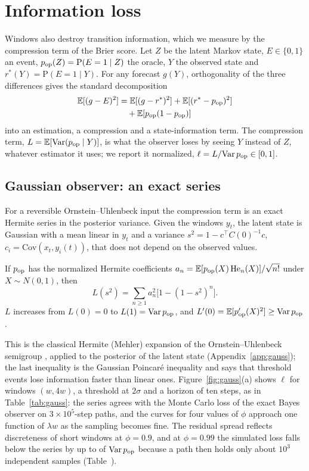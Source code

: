\section{Information loss}\label{sec:info}

Windows also destroy transition information, which we measure by the compression term of the Brier score. Let $Z$ be the latent Markov state, $E\in\{0,1\}$ an event, $p_{\mathrm{op}}(Z)=\mathrm P(E=1\mid Z)$ the oracle, $Y$ the observed state and $r^*(Y)=\mathrm P(E=1\mid Y)$. For any forecast $g(Y)$, orthogonality of the three differences gives the standard decomposition \cite{murphy1973,degroot1983,brocker2009}
\begin{align}
\mathbb{E}[(g-E)^2]&=\mathbb{E}[(g-r^*)^2]+\mathbb{E}[(r^*-p_{\mathrm{op}})^2]\nonumber\\
&\quad+\mathbb{E}[p_{\mathrm{op}}(1-p_{\mathrm{op}})]
\end{align}
into an estimation, a compression and a state-information term. The compression term, $L=\mathbb{E}[\mathrm{Var}(p_{\mathrm{op}}\mid Y)]$, is what the observer loses by seeing $Y$ instead of $Z$, whatever estimator it uses; we report it normalized, $\ell=L/\mathrm{Var}\,p_{\mathrm{op}}\in[0,1]$.

\subsection{Gaussian observer: an exact series}\label{sec:mehler}

For a reversible Ornstein--Uhlenbeck input the compression term is an exact Hermite series in the posterior variance. Given the windows $y_t$, the latent state is Gaussian with a mean linear in $y_t$ and a variance $s^2=1-c^\top C(0)^{-1}c$, $c_i=\mathrm{Cov}(x_t,y_i(t))$, that does not depend on the observed values.

\begin{lemma}\label{lem:mehler}
If $p_{\mathrm{op}}$ has the normalized Hermite coefficients $a_n=\mathbb{E}[p_{\mathrm{op}}(X)\,\mathrm{He}_n(X)]/\sqrt{n!}$ under $X\sim N(0,1)$, then
\begin{equation}
L(s^2)=\sum_{n\ge1}a_n^2\big[1-(1-s^2)^n\big].\label{eq:mehler}
\end{equation}
$L$ increases from $L(0)=0$ to $L(1)=\mathrm{Var}\,p_{\mathrm{op}}$, and $L'(0)=\mathbb{E}[p_{\mathrm{op}}'(X)^2]\ge\mathrm{Var}\,p_{\mathrm{op}}$.
\end{lemma}

This is the classical Hermite (Mehler) expansion of the Ornstein--Uhlenbeck semigroup \cite{mehler1866,odonnell2014}, applied to the posterior of the latent state (Appendix~\ref{app:gauss}); the last inequality is the Gaussian Poincar\'e inequality and says that threshold events lose information faster than linear ones. Figure~\ref{fig:gauss}(a) shows $\ell$ for windows $(w,4w)$, a threshold at $2\sigma$ and a horizon of ten steps, as in Table~\ref{tab:gauss}: the series agrees with the Monte Carlo loss of the exact Bayes observer on $3\times10^5$-step paths, and the curves for four values of $\phi$ approach one function of $\lambda w$ as the sampling becomes fine. The residual spread reflects discreteness of short windows at $\phi=0.9$, and at $\phi=0.99$ the simulated loss falls below the series by up to \MCDevNineNine of $\mathrm{Var}\,p_{\mathrm{op}}$ because a path then holds only about $10^3$ independent samples (Table~).

